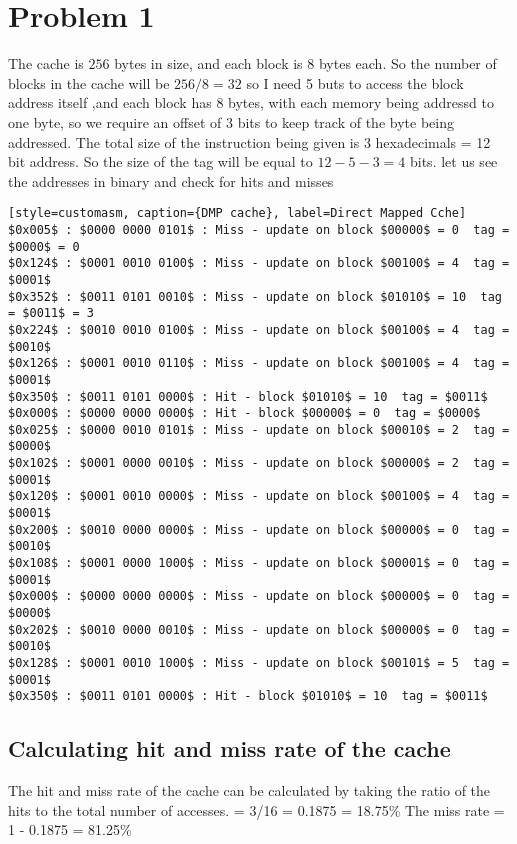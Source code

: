 \section{Problem 1}
The cache is $256$ bytes in size, and each block is $8$ bytes each. So the number of blocks in the cache will be $256/8 = 32 $
so I need 5 buts to access the block address itself ,and each block has 8 bytes, with each memory being addressd to one byte, so we require an offset of 3 bits to keep track of the byte
being addressed. The total size of the instruction being given is 3 hexadecimals = 12 bit address. So the size of the tag will be equal to $12 - 5 - 3 = 4$ bits.
let us see the addresses in binary and check for hits and misses
\\
\begin{verbatim}[style=customasm, caption={DMP cache}, label=Direct Mapped Cche]
$0x005$ : $0000 0000 0101$ : Miss - update on block $00000$ = 0  tag = $0000$ = 0
$0x124$ : $0001 0010 0100$ : Miss - update on block $00100$ = 4  tag = $0001$
$0x352$ : $0011 0101 0010$ : Miss - update on block $01010$ = 10  tag = $0011$ = 3
$0x224$ : $0010 0010 0100$ : Miss - update on block $00100$ = 4  tag = $0010$
$0x126$ : $0001 0010 0110$ : Miss - update on block $00100$ = 4  tag = $0001$
$0x350$ : $0011 0101 0000$ : Hit - block $01010$ = 10  tag = $0011$
$0x000$ : $0000 0000 0000$ : Hit - block $00000$ = 0  tag = $0000$
$0x025$ : $0000 0010 0101$ : Miss - update on block $00010$ = 2  tag = $0000$
$0x102$ : $0001 0000 0010$ : Miss - update on block $00000$ = 2  tag = $0001$
$0x120$ : $0001 0010 0000$ : Miss - update on block $00100$ = 4  tag = $0001$
$0x200$ : $0010 0000 0000$ : Miss - update on block $00000$ = 0  tag = $0010$
$0x108$ : $0001 0000 1000$ : Miss - update on block $00001$ = 0  tag = $0001$
$0x000$ : $0000 0000 0000$ : Miss - update on block $00000$ = 0  tag = $0000$
$0x202$ : $0010 0000 0010$ : Miss - update on block $00000$ = 0  tag = $0010$
$0x128$ : $0001 0010 1000$ : Miss - update on block $00101$ = 5  tag = $0001$
$0x350$ : $0011 0101 0000$ : Hit - block $01010$ = 10  tag = $0011$
\end{verbatim}

\subsection{Calculating hit and miss rate of the cache}
The hit and miss rate of the cache can be calculated by taking the ratio of the hits to the total number of accesses.
 = 3/16 = 0.1875 = 18.75\%
 The miss rate = 1 - 0.1875 = 81.25\%
